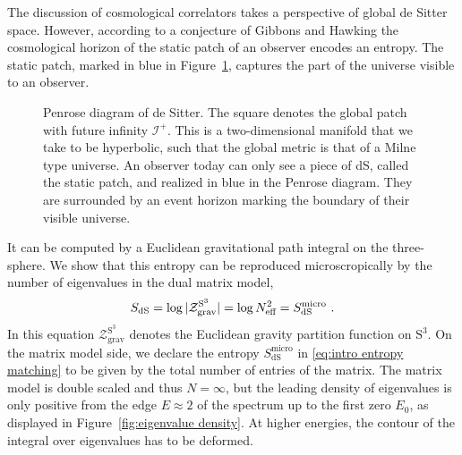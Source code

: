 \documentclass[12pt,a4paper]{article}
\begin{document}
The discussion of cosmological correlators takes a perspective of global de Sitter space. However, according to a conjecture of Gibbons and Hawking \cite{Gibbons:1976ue, Gibbons:1977mu} the cosmological horizon of the static patch of an observer encodes an entropy. The static patch, marked in blue in Figure~\ref{fig:penrose}, captures the part of the universe visible to an observer.
\begin{figure}[ht]
\centering
\caption{Penrose diagram of de Sitter. The square denotes the global patch with future infinity $\mathcal{I}^+$. This is a two-dimensional manifold that we take to be hyperbolic, such that the global metric is that of a Milne type universe. An observer today can only see a piece of dS, called the static patch, and realized in blue in the Penrose diagram. They are surrounded by an event horizon marking the boundary of their visible universe. }
\label{fig:penrose}
\end{figure} 
It can be computed by a Euclidean gravitational path integral on the three-sphere. We show that this entropy can be reproduced microscropically by the number of eigenvalues in the dual matrix model, 
\begin{equation}
    S_{\rm dS} = \log |\mathcal{Z}_{\mathrm{grav}}^{\mathrm{S}^3}|= \log N_\text{eff}^2 = S_{\text{dS}}^\text{micro} ~. \label{eq:intro entropy matching}
\end{equation}
In this equation $\mathcal{Z}_{\mathrm{grav}}^{\mathrm{S}^3}$ denotes the  Euclidean gravity partition function on $\mathrm{S}^3$. On the matrix model side, we declare the entropy $S_{\text{dS}}^\text{micro}$ in \eqref{eq:intro entropy matching} to be given by the total number of entries of the matrix. The matrix model is double scaled and thus $N=\infty$, but the leading density of eigenvalues is only positive from the edge $E \approx 2$ of the spectrum up to the first zero $E_0$, as displayed in Figure~\ref{fig:eigenvalue density}. At higher energies, the contour of the integral over eigenvalues has to be deformed.
\end{document}
